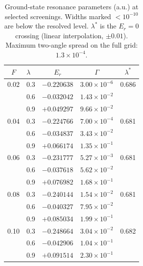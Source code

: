 \documentclass[aps,pre,twocolumn,superscriptaddress,floatfix,longbibliography]{revtex4-2}
\begin{document}
\begin{table}[tb]
\caption{\label{tab:map}Ground-state resonance parameters (a.u.)
at selected screenings. Widths marked $<10^{-10}$ are below the
resolved level. $\lambda^{*}$ is the $E_r=0$ crossing (linear
interpolation, $\pm0.01$). Maximum two-angle spread on the full
grid: $1.3\times10^{-4}$.}
\begin{ruledtabular}
\begin{tabular}{clccc}
$F$ & $\lambda$ & $E_r$ & $\Gamma$ & $\lambda^{*}$ \\
\hline
0.02 & 0.3 & $-0.220638$ & $3.00\times10^{-6}$ & 0.686 \\
     & 0.6 & $-0.032042$ & $1.43\times10^{-2}$ & \\
     & 0.9 & $+0.049297$ & $9.66\times10^{-2}$ & \\
0.04 & 0.3 & $-0.224766$ & $7.00\times10^{-4}$ & 0.681 \\
     & 0.6 & $-0.034837$ & $3.43\times10^{-2}$ & \\
     & 0.9 & $+0.066174$ & $1.35\times10^{-1}$ & \\
0.06 & 0.3 & $-0.231777$ & $5.27\times10^{-3}$ & 0.681 \\
     & 0.6 & $-0.037618$ & $5.62\times10^{-2}$ & \\
     & 0.9 & $+0.076982$ & $1.68\times10^{-1}$ & \\
0.08 & 0.3 & $-0.240144$ & $1.54\times10^{-2}$ & 0.681 \\
     & 0.6 & $-0.040327$ & $7.95\times10^{-2}$ & \\
     & 0.9 & $+0.085034$ & $1.99\times10^{-1}$ & \\
0.10 & 0.3 & $-0.248664$ & $3.04\times10^{-2}$ & 0.682 \\
     & 0.6 & $-0.042906$ & $1.04\times10^{-1}$ & \\
     & 0.9 & $+0.091514$ & $2.30\times10^{-1}$ & \\
\end{tabular}
\end{ruledtabular}
\end{table}
\end{document}
